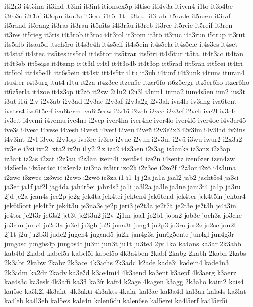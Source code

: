 {iti2n3
i4t3ina
it3ind
it3ini
it3int
itionsex5p
i4tiso
iti4v3a
itiven4
i1to
it3o4be
i3to3c
i2t3of
it3opu
itor3a
it3orc
i1tö
i1tr
i3tra.
it3rab
it5rade
it5raeu
it3raf
it5rand
it5rang
it3ras
it3rau
it5räts
i4t3räu
it3reb
it3rec
it5reic
it5reif
it3ren
it3res
it5rieg
it3ris
i4t3rob
it3roc
i4t3rol
it3rom
it3rö
it3ruc
i4t3run
i5trup
it3rut
its5alb
itsau5d
itsch5ro
it4s3e4h
it4s5eif
it4s5ein
it4s5ela
it4s5ele
it4s3es
it4set
it4staf
it4stec
its5tes
its5tol
it4s5tor
its5trau
its5tri
it4s5tur
it5ta.
it4t3ac
it4tän
it4t3eb
itt5eige
it4temp
it4t3il
it4tl
it4t3o4b
it4t3op
itt5rad
itt5rän
itt5rei
it4tri
itt5rol
itt4s5e4h
itt6s5ein
itt4sti
itt4s5tr
i1tu
it3uh
i4tunf
i4t3unk
i4tuns
ituran4
itu4rer
i4t3urg
itut4
i1tü
it2za
it4z3ec
itzen5e
itzer6fo
it6z5ergr
itz5er6ho
itzer6hö
it6z5erla
it4zoe
it4z3op
it2zö
it2zw
2i1u2
i2u3l
i3um1
iuma2
ium4s5en
iun2
ius3t
i3ut
i1ü
2iv
i2v3ab
i2v3ad
i2v3ae
i2v3af
i2v3a2g
i2v3ak
iva4lo
iv3ang
iva6tent
ivater4
iva6t5erf
iva6term
iva6t5erw
i2v1ä
i2veb
i2vec
i2v3ef
i2vek
ive2l
iv3ele
iv3elt
i4vemi
i4vemu
ive4no
i2vep
iver4ha
iver4he
iver4lo
iver4lö
iver4oe
i4v3er4ö
ive3s
i4vesc
i4vese
i4vesh
i4vest
i4veti
i2veu
i2veü
i2v3e2x3
i2v3im
i4v3ind
iv3ins
i4v3int
i2vl
i3vol
i2v3op
ivo3re
iv3ro
i2vue
i2vun
i2v3ur
i2vü
i3wu
iwur2
i2x3a2
ix3ele
i3xi
ixt2
ixta2
ix2u
i1y2
2iz
iza2
i4z3aen
i2z3ag
iz5anke
iz3anz
i2z3ap
iz3art
iz2as
i2zat
i2z3au
i2z3än
izein4t
izeit5s4
ize2n
i4zentz
izen6zer
izen4zw
i4z5erle
i4z5er4sc
i4z3er4z
izi3na
iz3irr
izo2b
i2z3oe
i2zo2f
i2z3or
i2zö
i4z3una
i2zwe
i3zwec
iz3wic
i2zwo
i2zwö
iz3za
í1
ï1
1j
j2a
ja1a
jaal2
jab2
jacht5s4
ja3ei
ja3er
ja1f
jaf2l
jag4da
jah4r5ei
jahr4s3
ja1i
ja3l2a
ja3le
ja3ne
jani3t4
ja1p
ja3ru
2jd
je2a
jean4s
jee2p
je2g
jek4ta
jek4tei
jekten4
jek6tend
jek4ter
jek4t5in
jektor4
jek6t5ort
jek4t3r
jek4t3u
je3na3e
je2p
jeri3
je2t3a
je2t3ä
je2t3e
je2t3h
je4t3in
je4tor
je2t3r
jet3s2
jet3t
je2t3u2
ji2v
2j1m
joa1
jo2b1
joba2
job3e
joch3a
jo3che
jo3chu
jock4
jo2d3a
jo3el
jo3gh
jo2i
jona3t
jong4
jo2p3
jo3ra
jor2z
jo2sc
jou2l
2j1t
j2u
ju2b3l
jude2
jugen4
jugend5
ju2k
jun4g3a
jun6g5ente
jun4gl
jun4g3r
jung5sc
jung5s4p
jung5s4t
ju3ni
jun3t
ju1t
ju3te3
2jv
1ka
ka4ans
ka3ar
2k3abb
kab4bl
2kabd
kabel5a
kabel5i
kabel5o
4k3a4ben
2kabf
2kabg
2kabh
2kabn
2kabs
2k3abt
2kabw
2kabz
2k3ace
4k3achs
2k3add
k2ade
kade3i
kadein4
kade4n3
2k3adm
ka2dr
2kadv
ka3e2d
k3ae4mi4
4k3aend
ka3ent
k3aepf
4k3aerg
k3aerz
kae4s3c
ka3esk
4k3affi
ka3fl
ka3fr
kaft4
k2age
4kagen
k3agg
2k3aho
kaim2
kais4
kai5se
ka3k2l
4k3akt.
4k3akti
4k3akts
4kala.
kal3ac
kal3a4d
kal3an
kala4s
ka3lat
ka4leb
ka4l3eh
kal5eis
kale4n
kalen6du
kalen6se
kal5erei
ka4l5erf
ka4l5er5i
}
